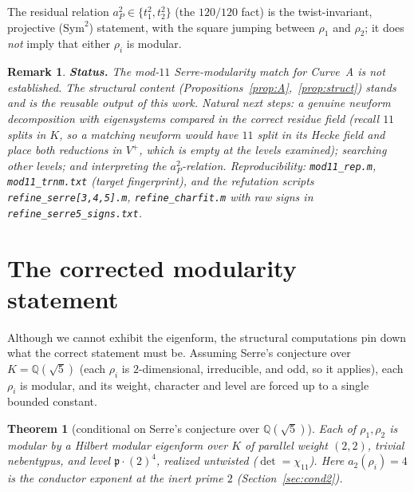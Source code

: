 \documentclass[11pt]{article}
\newtheorem{theorem}{Theorem}
\newtheorem{remark}{Remark}
\newcommand{\bbQ}{\mathbb{Q}}
\newcommand{\chicyc}{\chi_{11}}
\begin{document}
The residual relation $a_P^2\in\{t_1^2,t_2^2\}$ (the $120/120$ fact) is the twist-invariant,
projective ($\mathrm{Sym}^2$) statement, with the square jumping between $\rho_1$ and $\rho_2$;
it does \emph{not} imply that either $\rho_i$ is modular.

\begin{remark}
\textbf{Status.} The mod-$11$ Serre-modularity match for Curve~A is \emph{not} established.
The structural content (Propositions~\ref{prop:A},~\ref{prop:struct}) stands and is the
reusable output of this work. Natural next steps: a genuine newform decomposition with
eigensystems compared in the correct residue field (recall $11$ \emph{splits} in $K$, so a
matching newform would have $11$ split in its Hecke field and place both reductions in $V^+$,
which is empty at the levels examined); searching other levels; and interpreting the
$a_P^2$-relation. Reproducibility: \texttt{mod11\_rep.m}, \texttt{mod11\_trnm.txt} (target
fingerprint), and the refutation scripts \texttt{refine\_serre[3,4,5].m},
\texttt{refine\_charfit.m} with raw signs in \texttt{refine\_serre5\_signs.txt}.
\end{remark}

\section{The corrected modularity statement}\label{sec:derived}

Although we cannot exhibit the eigenform, the structural computations pin down what the correct
statement must be. Assuming Serre's conjecture over $K=\bbQ(\sqrt5)$ (each $\rho_i$ is
$2$-dimensional, irreducible, and odd, so it applies), each $\rho_i$ is modular, and its weight,
character and level are forced up to a single bounded constant.

\begin{theorem}[conditional on Serre's conjecture over $\bbQ(\sqrt5)$]\label{thm:derived}
Each of $\rho_1,\rho_2$ is modular by a Hilbert modular eigenform over $K$ of parallel weight
$(2,2)$, trivial nebentypus, and level $\mathfrak p\cdot(2)^{4}$, realized untwisted
($\det=\chicyc$). Here $a_2(\rho_i)=4$ is the conductor exponent at the inert prime $2$
(Section~\ref{sec:cond2}).
\end{theorem}
\end{document}
